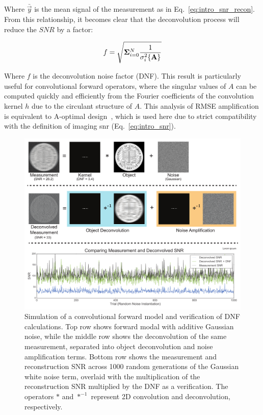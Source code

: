 Where $\bar{\vec{y}}$ is the mean signal of the measurement as in Eq.~\ref{eq:intro_snr_recon}. From this relationship, it becomes clear that the deconvolution process will reduce the $SNR$ by a factor:

\begin{equation}\label{eq:intro_dnf}
    f = \sqrt{\mathbf{\Sigma}_{i=0}^N{\frac{1}{\sigma_i^2\{\mathbf{A}\}}}}
\end{equation}

Where $f$ is the deconvolution noise factor (DNF). This result is particularly useful for convolutional forward operators, where the singular values of $A$ can be computed quickly and efficiently from the Fourier coefficients of the convolution kernel $h$ due to the circulant structure of $A$. This analysis of RMSE amplification is equivalent to A-optimal design~\cite{chernoff1953locally}, which is used here due to strict compatibility with the definition of imaging snr (Eq.~\ref{eq:intro_snr}).

\begin{figure}[tbh]
\centering
\includegraphics[width=\textwidth]{figures/fig_intro_dnf.pdf}
\caption{\label{fig:intro:dnf} Simulation of a convolutional forward model and verification of DNF calculations. Top row shows forward modal with additive Gaussian noise, while the middle row shows the deconvolution of the same measurement, separated into object deconvolution and noise amplification terms. Bottom row shows the measurement and reconstruction SNR across 1000 random generations of the Gaussian white noise term, overlaid with the multiplication of the reconstruction SNR multiplied by the DNF as a verification. The operators $*$ and $*^{-1}$ represent 2D convolution and deconvolution, respectively.}
\end{figure}

